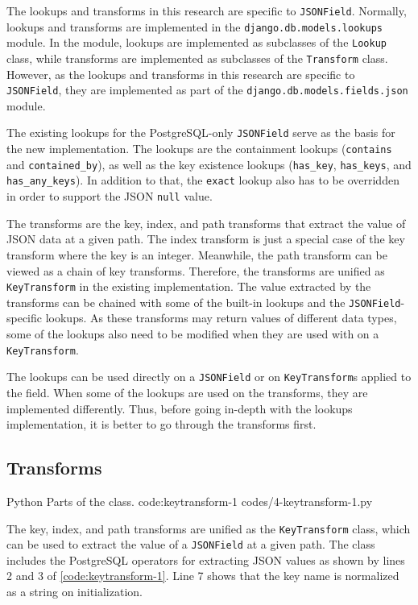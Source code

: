 The lookups and transforms in this research are specific to \verb|JSONField|.
Normally, lookups and transforms are implemented in the
\verb|django.db.models.lookups| module. In the module, lookups are implemented
as subclasses of the \verb|Lookup| class, while transforms are implemented as
subclasses of the \verb|Transform| class. However, as the lookups and
transforms in this research are specific to \verb|JSONField|, they are
implemented as part of the \verb|django.db.models.fields.json| module.

The existing lookups for the PostgreSQL-only \verb|JSONField| serve as the
basis for the new implementation. The lookups are the containment lookups
(\verb|contains| and \verb|contained_by|), as well as the key existence
lookups (\verb|has_key|, \verb|has_keys|, and \verb|has_any_keys|). In addition
to that, the \verb|exact| lookup also has to be overridden in order to
support the JSON \verb|null| value.

The transforms are the key, index, and path transforms that extract the value
of JSON data at a given path. The index transform is just a special case of
the key transform where the key is an integer. Meanwhile, the path transform
can be viewed as a chain of key transforms. Therefore, the transforms are
unified as \verb|KeyTransform| in the existing implementation. The value
extracted by the transforms can be chained with some of the built-in lookups
and the \verb|JSONField|-specific lookups. As these transforms may return
values of different data types, some of the lookups also need to be modified
when they are used with on a \verb|KeyTransform|.

The lookups can be used directly on a \verb|JSONField| or on
\verb|KeyTransform|s applied to the field. When some of the lookups are used on
the transforms, they are implemented differently. Thus, before going in-depth
with the lookups implementation, it is better to go through the transforms
first.

\subsection{ Transforms}

\listing
{Python}
{Parts of the  class.}
{code:keytransform-1}
{codes/4-keytransform-1.py}

The key, index, and path
transforms are unified as the \verb|KeyTransform| class, which can be used to
extract the value of a \verb|JSONField| at a given path. The class includes the
{PostgreSQL} operators for extracting JSON values as shown by lines 2 and 3
of \autoref{code:keytransform-1}. Line 7 shows that the key name is normalized
as a string on initialization.

